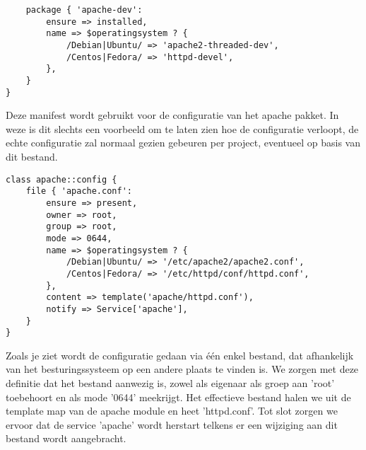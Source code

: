 %
\begin{code}
\begin{lstlisting}
	package { 'apache-dev':
		ensure => installed,
		name => $operatingsystem ? {
			/Debian|Ubuntu/ => 'apache2-threaded-dev',
			/Centos|Fedora/ => 'httpd-devel',
		},
	}
}
\end{lstlisting}
\end{code}
Deze manifest wordt gebruikt voor de configuratie van het apache pakket. In weze is dit slechts een voorbeeld om te laten zien hoe de configuratie verloopt, de echte configuratie zal normaal gezien gebeuren per project, eventueel op basis van dit bestand.
%
\begin{code}
\begin{lstlisting}
class apache::config {
	file { 'apache.conf':
		ensure => present,
		owner => root,
		group => root,
		mode => 0644,
		name => $operatingsystem ? {
			/Debian|Ubuntu/ => '/etc/apache2/apache2.conf',
			/Centos|Fedora/ => '/etc/httpd/conf/httpd.conf',
		},
		content => template('apache/httpd.conf'),
		notify => Service['apache'],
	}
}
\end{lstlisting}
\end{code}
%
Zoals je ziet wordt de configuratie gedaan via \'e\'en enkel bestand, dat afhankelijk van het besturingssysteem op een andere plaats te vinden is. We zorgen met deze definitie dat het bestand aanwezig is, zowel als eigenaar als groep aan 'root' toebehoort en als mode '0644' meekrijgt. Het effectieve bestand halen we uit de template map van de apache module en heet 'httpd.conf'. Tot slot zorgen we ervoor dat de service 'apache' wordt herstart telkens er een wijziging aan dit bestand wordt aangebracht.
%
